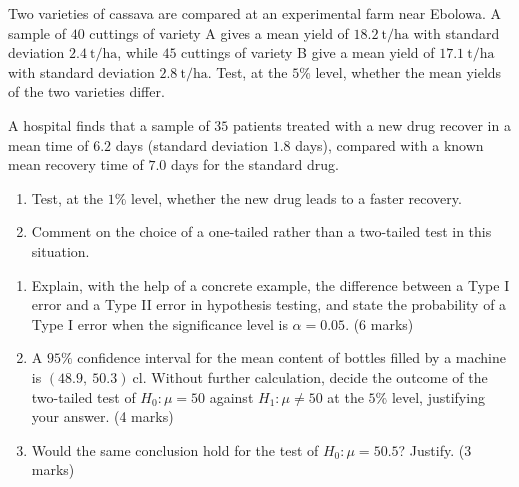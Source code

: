 \documentclass[11pt]{article}
\newcounter{popsec}
\newcounter{popsub}
\newcommand{\courssub}[1]{%
  \stepcounter{popsub}%
  \par\vspace{9pt}\noindent{\popxbold\fontsize{11.5}{13}\selectfont\color{popink}{\color{poporange}\thepopsec.\thepopsub}\hspace{6pt}#1}\par\nopagebreak\vspace{4pt}
}
\begin{document}
\begin{exercice}
Two varieties of cassava are compared at an experimental farm near Ebolowa. A sample of $40$ cuttings of variety A gives a mean yield of $18.2\ \mathrm{t/ha}$ with standard deviation $2.4\ \mathrm{t/ha}$, while $45$ cuttings of variety B give a mean yield of $17.1\ \mathrm{t/ha}$ with standard deviation $2.8\ \mathrm{t/ha}$. Test, at the $5\%$ level, whether the mean yields of the two varieties differ.
\end{exercice}

\begin{exercice}
A hospital finds that a sample of $35$ patients treated with a new drug recover in a mean time of $6.2$ days (standard deviation $1.8$ days), compared with a known mean recovery time of $7.0$ days for the standard drug.
\begin{enumerate}
\item Test, at the $1\%$ level, whether the new drug leads to a faster recovery.
\item Comment on the choice of a one-tailed rather than a two-tailed test in this situation.
\end{enumerate}
\end{exercice}

\courssub{I prepare for the GCE}

\begin{exercice}
\begin{enumerate}
\item Explain, with the help of a concrete example, the difference between a Type I error and a Type II error in hypothesis testing, and state the probability of a Type I error when the significance level is $\alpha=0.05$. \hfill (6 marks)
\item A $95\%$ confidence interval for the mean content of bottles filled by a machine is $(48.9,\ 50.3)\ \mathrm{cl}$. Without further calculation, decide the outcome of the two-tailed test of $H_0:\mu=50$ against $H_1:\mu\neq 50$ at the $5\%$ level, justifying your answer. \hfill (4 marks)
\item Would the same conclusion hold for the test of $H_0:\mu=50.5$? Justify. \hfill (3 marks)
\end{enumerate}
\end{exercice}
\end{document}
